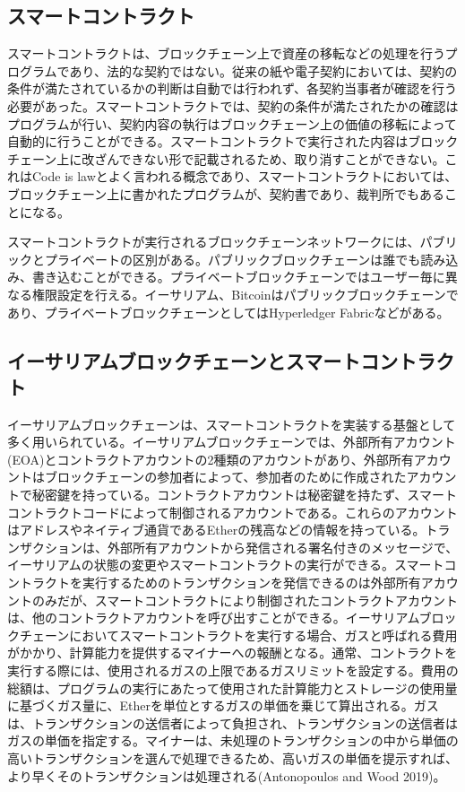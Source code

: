\documentclass[a4paper,fontsize=11pt,report,notitlepage,line_length=38zw,number_of_lines=40,dvipdfmx]{jlreq}
\begin{document}
\subsection{スマートコントラクト}
スマートコントラクトは、ブロックチェーン上で資産の移転などの処理を行うプログラムであり、法的な契約ではない。従来の紙や電子契約においては、契約の条件が満たされているかの判断は自動では行われず、各契約当事者が確認を行う必要があった。スマートコントラクトでは、契約の条件が満たされたかの確認はプログラムが行い、契約内容の執行はブロックチェーン上の価値の移転によって自動的に行うことができる。スマートコントラクトで実行された内容はブロックチェーン上に改ざんできない形で記載されるため、取り消すことができない。これはCode is lawとよく言われる概念であり、スマートコントラクトにおいては、ブロックチェーン上に書かれたプログラムが、契約書であり、裁判所でもあることになる\cite{nagasawa2013}。

スマートコントラクトが実行されるブロックチェーンネットワークには、パブリックとプライベートの区別がある。パブリックブロックチェーンは誰でも読み込み、書き込むことができる。プライベートブロックチェーンではユーザー毎に異なる権限設定を行える。イーサリアム、Bitcoinはパブリックブロックチェーンであり、プライベートブロックチェーンとしてはHyperledger Fabricなどがある。

\subsection{イーサリアムブロックチェーンとスマートコントラクト}
イーサリアムブロックチェーンは、スマートコントラクトを実装する基盤として多く用いられている。イーサリアムブロックチェーンでは、外部所有アカウント(EOA)とコントラクトアカウントの2種類のアカウントがあり、外部所有アカウントはブロックチェーンの参加者によって、参加者のために作成されたアカウントで秘密鍵を持っている。コントラクトアカウントは秘密鍵を持たず、スマートコントラクトコードによって制御されるアカウントである。これらのアカウントはアドレスやネイティブ通貨であるEtherの残高などの情報を持っている。トランザクションは、外部所有アカウントから発信される署名付きのメッセージで、イーサリアムの状態の変更やスマートコントラクトの実行ができる。スマートコントラクトを実行するためのトランザクションを発信できるのは外部所有アカウントのみだが、スマートコントラクトにより制御されたコントラクトアカウントは、他のコントラクトアカウントを呼び出すことができる。イーサリアムブロックチェーンにおいてスマートコントラクトを実行する場合、ガスと呼ばれる費用がかかり、計算能力を提供するマイナーへの報酬となる。通常、コントラクトを実行する際には、使用されるガスの上限であるガスリミットを設定する。費用の総額は、プログラムの実行にあたって使用された計算能力とストレージの使用量に基づくガス量に、Etherを単位とするガスの単価を乗じて算出される。ガスは、トランザクションの送信者によって負担され、トランザクションの送信者はガスの単価を指定する。マイナーは、未処理のトランザクションの中から単価の高いトランザクションを選んで処理できるため、高いガスの単価を提示すれば、より早くそのトランザクションは処理される(Antonopoulos and Wood 2019)\cite{antonopoulos2019}。
\end{document}
